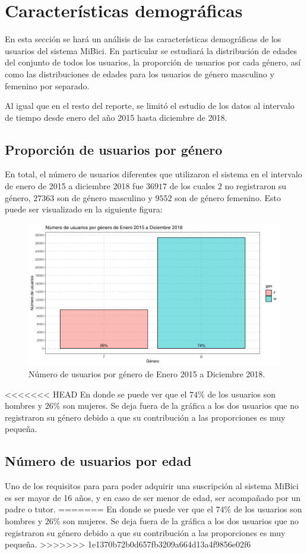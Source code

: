 \section*{Características demográficas}
En esta sección se hará un análisis de las características demográficas de los usuarios del sistema MiBici. En particular se estudiará la distribución de edades del conjunto de todos los usuarios, la proporción de usuarios por cada género, así como las distribuciones de edades para los usuarios de género masculino y femenino por separado.
\par Al igual que en el resto del reporte, se limitó el estudio de los datos al intervalo de tiempo desde enero del año 2015 hasta diciembre de 2018.
\subsection*{Proporción de usuarios por género}
En total, el número de usuarios diferentes que utilizaron el sistema en el intervalo de enero de 2015 a diciembre 2018 fue $36917$ de los cuales $2$ no registraron su género, $27363$ son de género masculino y $9552$ son de género femenino. Esto puede ser visualizado en la siguiente figura:
\begin{figure}[H]
	\centering
	\includegraphics[width=0.7\linewidth]{Graphics/genderProp}
	\caption{Número de usuarios por género de Enero 2015 a Diciembre 2018.}
	\label{fig:genderprop}
\end{figure}
<<<<<<< HEAD
En donde se puede ver que el $74\%$ de los usuarios son hombres y $26\%$ son mujeres. Se deja fuera de la gráfica a los dos usuarios que no registraron su género debido a que su contribución a las proporciones es muy pequeña.
\subsection*{Número de usuarios por edad}
Uno de los requisitos para para poder adquirir una suscripción al sistema MiBici es ser mayor de 16 años, y en caso de ser menor de edad, ser acompañado por un padre o tutor.
=======
En donde se puede ver que el $74\%$ de los usuarios son hombres y $26\%$ son mujeres. Se deja fuera de la gráfica a los dos usuarios que no registraron su género debido a que su contribución a las proporciones es muy pequeña.
>>>>>>> 1e1370b72b0d657fb3209a664d13a4f9856e02f6
